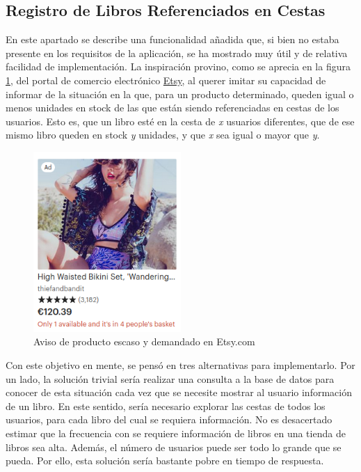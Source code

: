 \documentclass[a4paper]{article}
\begin{document}
    \subsection{Registro de Libros Referenciados en Cestas}
    En este apartado se describe una funcionalidad añadida que, si bien no estaba presente en los requisitos de la aplicación, se ha mostrado muy útil y de relativa facilidad de implementación. La inspiración provino, como se aprecia en la figura \ref{fig:etsy}, del portal de comercio electrónico \href{https://www.etsy.com}{Etsy}, al querer imitar su capacidad de informar de la situación en la que, para un producto determinado, queden igual o menos unidades en stock de las que están siendo referenciadas en cestas de los usuarios. Esto es, que un libro esté en la cesta de \emph{x} usuarios diferentes, que de ese mismo libro queden en stock \emph{y} unidades, y que \emph{x} sea igual o mayor que \emph{y}.
    
    \begin{figure}[htb!]
    	\centering
    	\includegraphics[width=0.5\textwidth]{etsy}
    	\caption{Aviso de producto escaso y demandado en Etsy.com}
    	\label{fig:etsy}
    \end{figure}
    
    Con este objetivo en mente, se pensó en tres alternativas para implementarlo. Por un lado, la solución trivial sería realizar una consulta a la base de datos para conocer de esta situación cada vez que se necesite mostrar al usuario información de un libro. En este sentido, sería necesario explorar las cestas de todos los usuarios, para cada libro del cual se requiera información. No es desacertado estimar que la frecuencia con se requiere información de libros en una tienda de libros sea alta. Además, el número de usuarios puede ser todo lo grande que se pueda. Por ello, esta solución sería bastante pobre en tiempo de respuesta.
    
\end{document}
